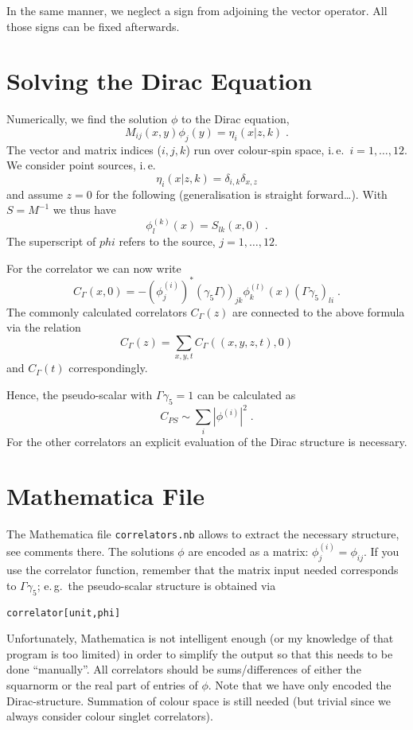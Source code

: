 \documentclass[a4paper]{article}
\begin{document}
In the same manner, we neglect a sign from adjoining the vector operator. All those signs can be fixed afterwards.


\section{Solving the Dirac Equation}
Numerically, we find the solution $\phi$ to the Dirac equation,
\begin{equation}
M_{ij}(x,y) \phi_j(y) = \eta_i(x|z,k)\;.
\end{equation}
The vector and matrix indices ($i,j,k$) run over colour-spin space, i.\,e.\ $i=1,\ldots,12$. We consider point sources, i.\,e.\
\begin{equation}
\eta_i(x|z,k) = \delta_{i,k} \delta_{x,z}
\end{equation}
and assume $z=0$ for the following (generalisation is straight forward\ldots).  With $S=M^{-1}$ we thus have
\begin{equation}
\phi_l^{(k)}(x) = S_{lk}(x,0)\;.
\end{equation}
The superscript of $phi$ refers to the source, $j=1,\ldots,12$.

For the correlator we can now write
\begin{equation}
C_\Gamma(x,0) = - \left(\phi_j^{(i)}\right)^* \left(\gamma_5\Gamma)\right)_{jk} \phi_k^{(l)}(x) \left(\Gamma\gamma_5\right)_{li}\;.
\end{equation}
The commonly calculated correlators $C_\Gamma(z)$ are connected to the above formula via the relation
\begin{equation}
C_\Gamma(z) = \sum_{x,y,t} C_\Gamma( (x,y,z,t), 0 )
\end{equation}
and $C_\Gamma(t)$ correspondingly.

Hence, the pseudo-scalar with $\Gamma\gamma_5=1$ can be calculated as
\begin{equation}
C_{PS}  \sim \sum_i \left| \phi^{(i)} \right|^2\;.
\end{equation}
For the other correlators an explicit evaluation of the Dirac structure is necessary. 


\section{Mathematica File}
The Mathematica file \verb+correlators.nb+ allows to extract the necessary structure, see comments there. The solutions $\phi$ are encoded as a matrix: $\phi^{(i)}_j = \phi_{ij}$. If you use the correlator function, remember that the matrix input needed corresponds to $\Gamma\gamma_5$; e.\,g.\ the pseudo-scalar structure is obtained via
\begin{verbatim}
correlator[unit,phi]
\end{verbatim} 
Unfortunately, Mathematica is not intelligent enough (or my knowledge of that program is too limited) in order to simplify the output so that this needs to be done ``manually''. All correlators should be sums/differences of either the squarnorm or the real part of entries of $\phi$. Note that we have only encoded the Dirac-structure. Summation of colour space is still needed (but trivial since we always consider colour singlet correlators).
\end{document}
